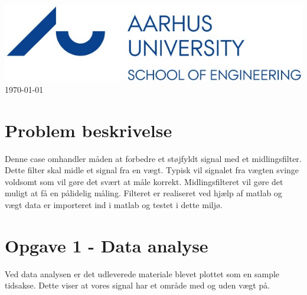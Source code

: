 \documentclass[12pt]{article}
\begin{document}
\begin{titlepage}

\includegraphics[scale=0.5]{Img/logo.jpg}\\[1cm]


{\large \today}\\[0.5cm] %


\vfill %

\end{titlepage}

\newpage
\tableofcontents
\newpage
\listoffigures
\newpage

\hypersetup{linkcolor=blue}

\section{Problem beskrivelse}
\begin{flushleft}
		Denne case omhandler måden at forbedre et støjfyldt signal med et midlingsfilter. Dette filter skal midle et signal fra en vægt. Typisk vil signalet fra vægten svinge voldsomt som vil gøre det svært at måle korrekt. Midlingsfilteret vil gøre det muligt at få en pålidelig måling. Filteret er realiseret ved hjælp af matlab og vægt data er importeret ind i matlab og testet i dette miljø.
\end{flushleft}

\section{Opgave 1 - Data analyse}
Ved data analysen er det udleverede materiale blevet plottet som en sample tidsakse. Dette viser at vores signal har et område med og uden vægt på. 
\end{document}
